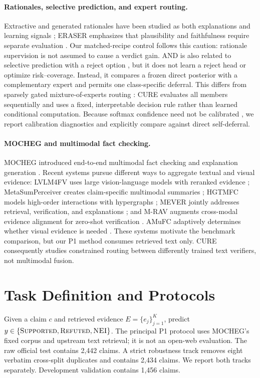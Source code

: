\documentclass[11pt]{article}
\begin{document}
\paragraph{Rationales, selective prediction, and expert routing.} Extractive and generated rationales have been studied as both explanations and learning signals \citep{lei2016rationalizing,atanasova2020factexplanations}; ERASER emphasizes that plausibility and faithfulness require separate evaluation \citep{deyoung2020eraser}. Our matched-recipe control follows this caution: rationale supervision is not assumed to cause a verdict gain. AND is also related to selective prediction with a reject option \citep{geifman2019selectivenet}, but it does not learn a reject head or optimize risk--coverage. Instead, it compares a frozen direct posterior with a complementary expert and permits one class-specific deferral. This differs from sparsely gated mixture-of-experts routing \citep{shazeer2017moe}: CURE evaluates all members sequentially and uses a fixed, interpretable decision rule rather than learned conditional computation. Because softmax confidence need not be calibrated \citep{guo2017calibration}, we report calibration diagnostics and explicitly compare against direct self-deferral.

\paragraph{MOCHEG and multimodal fact checking.} MOCHEG introduced end-to-end multimodal fact checking and explanation generation \citep{yao2023mocheg}. Recent systems pursue different ways to aggregate textual and visual evidence: LVLM4FV uses large vision-language models with reranked evidence \citep{tahmasebi2024lvlm4fv}; MetaSumPerceiver creates claim-specific multimodal summaries \citep{chen2024metasumperceiver}; HGTMFC models high-order interactions with hypergraphs \citep{pang2025hgtmfc}; MEVER jointly addresses retrieval, verification, and explanations \citep{zhang2026mever}; and M-RAV augments cross-modal evidence alignment for zero-shot verification \citep{luu2027mrav}. AMuFC adaptively determines whether visual evidence is needed \citep{jung2026amufc}. These systems motivate the benchmark comparison, but our P1 method consumes retrieved text only. \textsc{CURE} consequently studies constrained routing between differently trained text verifiers, not multimodal fusion.

\section{Task Definition and Protocols}
Given a claim $c$ and retrieved evidence $E=\{e_j\}_{j=1}^{K}$, predict $y\in\{\textsc{Supported},\textsc{Refuted},\textsc{NEI}\}$. The principal P1 protocol uses MOCHEG's fixed corpus and upstream text retrieval; it is not an open-web evaluation. The raw official test contains 2,442 claims. A strict robustness track removes eight verbatim cross-split duplicates and contains 2,434 claims. We report both tracks separately. Development validation contains 1,456 claims.
\end{document}
